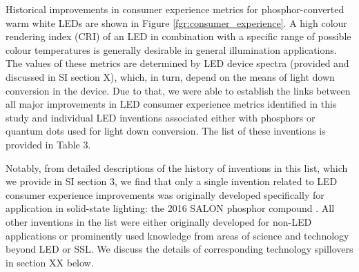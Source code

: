 \documentclass[twoside,twocolumn,9pt]{article}
\begin{document}
Historical improvements in consumer experience metrics for phosphor-converted warm white LEDs are shown in Figure \ref{fgr:consumer_experience}. A high colour rendering index (CRI) of an LED in combination with a specific range of possible colour temperatures is generally desirable in general illumination applications. The values of these metrics are determined by LED device spectra (provided and discussed in SI section X), which, in turn, depend on the means of light down conversion in the device. Due to that, we were able to establish the links between all major improvements in LED consumer experience metrics identified in this study and individual LED inventions associated either with phosphors or quantum dots used for light down conversion. The list of these inventions is provided in Table 3. 

Notably, from detailed descriptions of the history of inventions in this list, which we provide in SI section 3, we find that only a single invention related to LED consumer experience improvements was originally developed specifically for application in solid-state lighting: the 2016 SALON phosphor compound \cite{seibald2019phosphor}\cite{Hoerder2019}. All other inventions in the list were either originally developed for non-LED applications or prominently used knowledge from areas of science and technology beyond LED or SSL. We discuss the details of corresponding technology spillovers in section XX below. 
\end{document}
